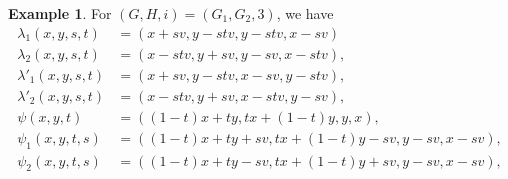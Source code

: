 \documentclass[reqno]{amsart}
\theoremstyle{definition}
\newtheorem{exa}[defi]{Example}
\theoremstyle{plain}
\begin{document}
\begin{exa}\label{Emaps_ch2}
For $(G, H, i)=(G_1,G_2,3)$, we have
\[
\begin{split}
\lambda_1(x,y,s,t)&=(x+sv,y-stv, y-stv,x-sv)\\
\lambda_2(x,y,s,t)&=(x-stv,y+sv,y-sv,x-stv),\\
\lambda'_1(x,y,s,t)&=(x+sv,y-stv,x-sv,y-stv),\\
\lambda'_2(x,y,s,t)&=(x-stv,y+sv,x-stv,y-sv),\\
\psi(x,y,t)&=((1-t)x+ty, tx+(1-t)y, y, x), \\
\psi_1(x,y,t,s)&=((1-t)x+ty+sv, tx+(1-t)y-sv, y-sv, x-sv), \\
\psi_2(x,y,t,s)&=((1-t)x+ty-sv, tx+(1-t)y+sv, y-sv, x-sv),
\end{split}
\]
\end{exa}
\end{document}
